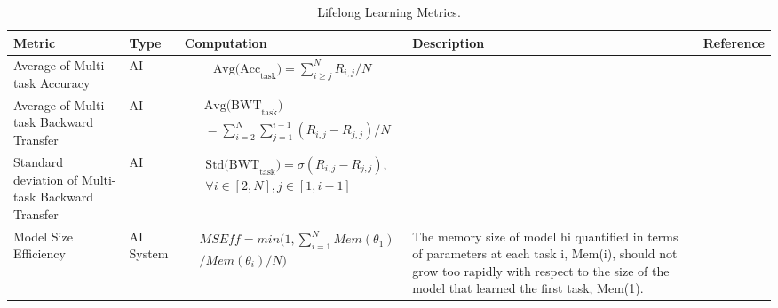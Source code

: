 \begin{table}[!ht]
\caption{Lifelong Learning Metrics.} 
\label{tab:ll}
\begin{tabular}{|p{2cm}|l|p{6cm}|p{3cm}|p{1.5cm}|}

\hline
Metric                 & Type      & Computation & Description                                                                & Reference 
\\ \hline

Average of Multi-task Accuracy
& AI 
& 
\parbox{3cm}{
    \begin{equation} \label{equ:aoma} 
    \begin{split}
\text{Avg(Acc}_\text{task}) = \sum^N_{i \geq j} R_{i,j} / N
    \end{split} 
    \end{equation} 
}
& 
& \cite{DBLP:journals/corr/abs-1810-13166,DBLP:conf/nips/Lopez-PazR17}       
\\ \hline

Average of Multi-task Backward Transfer
& AI 
& 
\parbox{3cm}{
    \begin{equation} \label{equ:aombt} 
    \begin{split}
& \text{Avg(BWT}_\text{task}) \\
& = \sum^{N}_{i=2}\sum^{i-1}_{j=1} (R_{i,j}-R_{j,j}) / N
    \end{split} 
    \end{equation} 
}
&  
& \cite{DBLP:journals/corr/abs-1810-13166,DBLP:conf/nips/Lopez-PazR17}       
\\ \hline


Standard deviation of Multi-task Backward Transfer
& AI 
& 
\parbox{3cm}{
    \begin{equation} \label{equ:sdombt} 
    \begin{split}
& \text{Std(BWT}_\text{task}) = \sigma(R_{i,j}-R_{j,j}), \\ 
& \forall i \in [2, N], j \in [1, i-1]
    \end{split} 
    \end{equation} 
}
&  
& \cite{DBLP:journals/corr/abs-1810-13166,DBLP:conf/nips/Lopez-PazR17}       
\\ \hline


Model Size Efficiency
& AI System
& 
\parbox{3cm}{
    \begin{equation} \label{equ:mseff} 
    \begin{split}
& MSEff = min(1, \sum_{i=1}^N Mem(\theta_1) \\
& / Mem(\theta_i) / N)
    \end{split} 
    \end{equation} 
}
& The memory size of model hi quantified in terms of parameters at each task i, Mem(i), should not grow too rapidly with respect to the size of the model that learned the first task, Mem(1). 
& \cite{DBLP:journals/corr/abs-1810-13166,DBLP:conf/nips/Lopez-PazR17}       
\\ \hline


\end{tabular}
\end{table}

